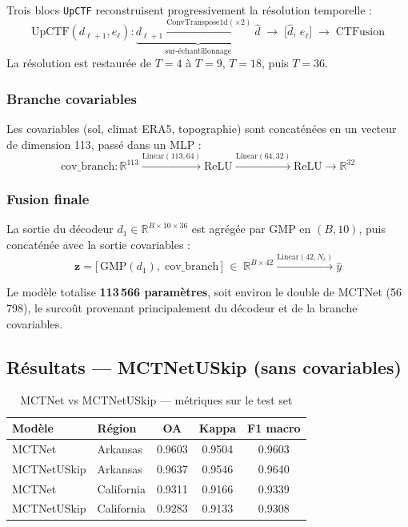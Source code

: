 Trois blocs \texttt{UpCTF} reconstruisent progressivement la résolution
temporelle :
\begin{equation}
  \text{UpCTF}(d_{\ell+1}, e_\ell) :
  \underbrace{d_{\ell+1} \xrightarrow{\text{ConvTranspose1d}(\times 2)}
  \hat{d}}_{\text{sur-échantillonnage}}
  \;\to\;
  \big[\hat{d},\, e_\ell\big]
  \;\to\;
  \text{CTFusion}
\end{equation}
La résolution est restaurée de $T=4$ à $T=9$, $T=18$, puis $T=36$.

\subsubsection{Branche covariables}

Les covariables (sol, climat ERA5, topographie) sont concaténées en un vecteur
de dimension 113, passé dans un MLP :
\begin{equation}
  \text{cov\_branch} : \mathbb{R}^{113}
  \xrightarrow{\text{Linear}(113,64)} \text{ReLU}
  \xrightarrow{\text{Linear}(64,32)} \text{ReLU}
  \to \mathbb{R}^{32}
\end{equation}

\subsubsection{Fusion finale}

La sortie du décodeur $d_1 \in \mathbb{R}^{B \times 10 \times 36}$ est agrégée
par GMP en $(B, 10)$, puis concaténée avec la sortie covariables :
\begin{equation}
  \mathbf{z} = \big[\,\text{GMP}(d_1),\;\text{cov\_branch}\,\big]
  \;\in\; \mathbb{R}^{B \times 42}
  \xrightarrow{\text{Linear}(42, N_c)} \hat{y}
\end{equation}

Le modèle totalise \textbf{113\,566 paramètres}, soit environ le double de
MCTNet (56\,798), le surcoût provenant principalement du décodeur et de la
branche covariables.

\subsection{Résultats — MCTNetUSkip (sans covariables)}

\begin{table}[H]
\centering
\caption{MCTNet vs MCTNetUSkip — métriques sur le test set}
\label{tab:resultats_uskip}
\begin{tabular}{llccc}
\toprule
\textbf{Modèle} & \textbf{Région} & \textbf{OA} & \textbf{Kappa} & \textbf{F1 macro} \\
\midrule
MCTNet      & Arkansas   & 0.9603 & 0.9504 & 0.9603 \\
MCTNetUSkip & Arkansas   & 0.9637 & 0.9546 & 0.9640 \\
\midrule
MCTNet      & California & 0.9311 & 0.9166 & 0.9339 \\
MCTNetUSkip & California & 0.9283 & 0.9133 & 0.9308 \\
\bottomrule
\end{tabular}
\end{table}

